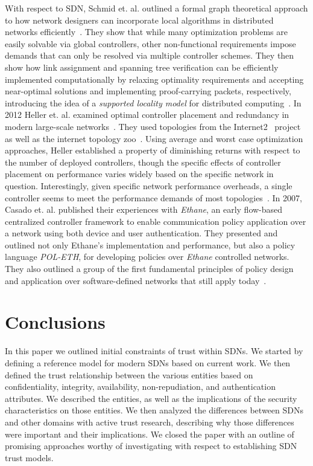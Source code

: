 \documentclass[10pt,conference]{IEEEtran}
\begin{document}
With respect to SDN, Schmid et. al. outlined a formal graph theoretical approach to how network designers can incorporate local algorithms in distributed networks efficiently~\cite{ScSu:13}.  They show that while many optimization problems are easily solvable via global controllers, other non-functional requirements impose demands that can only be resolved via multiple controller schemes. They then show how link assignment and spanning tree verification can be efficiently implemented computationally by relaxing optimality requirements and accepting near-optimal solutions and implementing proof-carrying packets, respectively, introducing the idea of a {\sl supported locality model} for distributed computing~\cite{ScSu:13}.  In 2012 Heller et. al. examined optimal controller placement and redundancy in modern large-scale networks~\cite{HeShMc:12}. They used topologies from the Internet2~\cite{internet2} project as well as the internet topology zoo~\cite{internet-topo-zoo}. Using average and worst case optimization approaches, Heller established a property of diminishing returns with respect to the number of deployed controllers, though the specific effects of controller placement on performance varies widely based on the specific network in question.  Interestingly, given specific network performance overheads, a single controller seems to meet the performance demands of most topologies~\cite{HeShMc:12}.  In 2007, Casado et. al. published their experiences with {\sl Ethane}, an early flow-based centralized controller framework to enable communication policy application over a network using both device and user authentication.  They presented and outlined not only Ethane's implementation and performance, but also a policy language {\sl POL-ETH}, for developing policies over {\sl Ethane} controlled networks.  They also outlined a group of the first fundamental principles of policy design and application over software-defined networks that still apply today~\cite{CaFrPeLu:07}.

\section{Conclusions}
In this paper we outlined initial constraints of trust within SDNs.  We started by defining a reference model for modern SDNs based on current work.  We then defined the trust relationship between the various entities based on confidentiality, integrity, availability, non-repudiation, and authentication attributes.  We described the entities, as well as the implications of the security characteristics on those entities.  We then analyzed the differences between SDNs and other domains with active trust research, describing why those differences were important and their implications.  We closed the paper with an outline of promising approaches worthy of investigating with respect to establishing SDN trust models.
\end{document}
